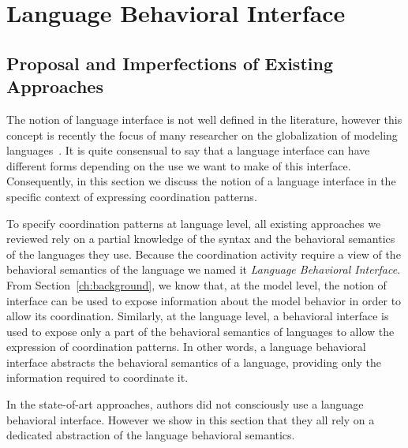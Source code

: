 \section{Language Behavioral Interface}
\subsection{Proposal and Imperfections of Existing Approaches}

The notion of language interface is not well defined in the literature, however this concept is recently the focus of many researcher on the globalization of modeling languages~\cite{GML_ch1, GML_ch3, GML_ch4, TdegeuleSLE}. It is quite consensual to say that a language interface can have different forms depending on the use we want to make of this interface. Consequently, in this section we discuss the notion of a language interface in the specific context of expressing coordination patterns. 

To specify coordination patterns at language level, all existing approaches we reviewed rely on a partial knowledge of the syntax and the behavioral semantics of the languages they use. Because the coordination activity require a view of the behavioral semantics of the language we named it \emph{Language Behavioral Interface}. From Section~\ref{ch:background}, we know that, at the model level, the notion of interface can be used to expose information about the model behavior in order to allow its coordination. Similarly, at the language level, a behavioral interface is used to expose only a part of the behavioral semantics of languages to allow the expression of coordination patterns. In other words, a language behavioral interface abstracts the behavioral semantics of a language, providing only the information required to coordinate it. 


In the state-of-art approaches, authors did not consciously use a language behavioral interface. However we show in this section that they all rely on a dedicated abstraction of the language behavioral semantics. 

